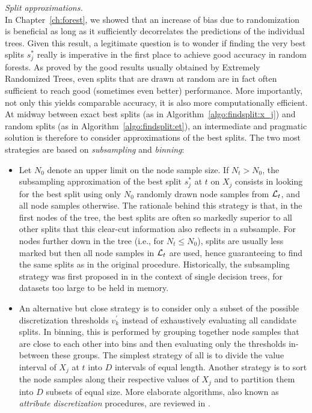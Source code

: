\begin{description}
\item \textit{Split approximations.}\hfill\\
    In Chapter~\ref{ch:forest}, we showed that an increase of bias due to
    randomization is beneficial as long as it sufficiently decorrelates the
    predictions of the individual trees. Given this result, a legitimate
    question is to wonder if finding the very best splits $s^*_j$ really is
    imperative in the first place to achieve good accuracy in random forests. As proved by the
    good results usually obtained by Extremely Randomized Trees, even splits
    that are drawn at random are in fact often sufficient to reach good
    (sometimes even better) performance. More importantly, not only this yields
    comparable accuracy, it is also more computationally efficient. At midway
    between  exact best splits (as in Algorithm~\ref{algo:findsplit:x_j}) and
    random splits (as in Algorithm~\ref{algo:findsplit:et}), an intermediate
    and pragmatic solution is therefore to consider approximations of the best splits.
    The two most strategies are based on \textit{subsampling} and \textit{binning}:

    \begin{itemize}
    \item Let $N_0$ denote an upper limit on the node sample size. If $N_t > N_0$,
          the subsampling approximation of the best split $s^*_j$ at $t$ on $X_j$ consists
          in looking for the best split using only $N_0$ randomly drawn node
          samples from ${\cal L}_t$, and all node samples otherwise. The rationale behind this strategy is
          that, in the first nodes of the tree, the best splits are often
          so markedly superior to all other splits that this clear-cut information
          also reflects in a subsample. For nodes further down in the tree (i.e., for $N_t \leq N_0$),
          splits are usually less marked but then all node samples in ${\cal L}_t$
          are used, hence guaranteeing to find the same splits as in the original procedure.
          Historically, the subsampling strategy was first proposed in \citep{breiman:1984}
          in the context of single decision trees, for datasets too large to be held in memory.

    \item An alternative but close strategy is to consider only a subset
          of the possible discretization thresholds $v^\prime_k$ instead
          of exhaustively evaluating all candidate splits. In binning, this
          is performed by grouping together node samples that are close
          to each other into bins and then evaluating only the thresholds in-between these groups.
          The simplest strategy of all is to divide the value interval of $X_j$
          at $t$ into $D$ intervals of equal length. Another strategy
          is to sort the node samples along their respective values of $X_j$
          and to partition them into $D$ subsets of equal size.
          More elaborate algorithms, also known as \textit{attribute discretization} procedures,
          are reviewed in \citep{zighed:2000}.
    \end{itemize}


\end{description}
